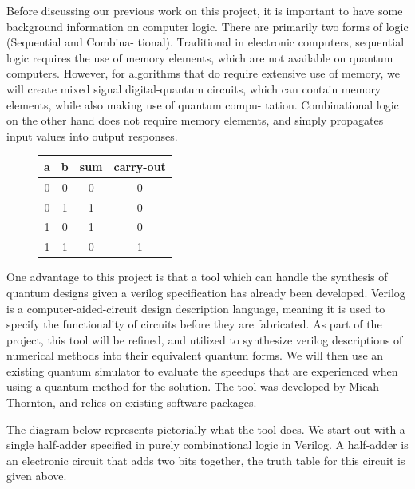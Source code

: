    Before discussing our previous work on this project, it is important to have
some background information on computer logic. There are primarily two forms of logic (Sequential and Combina-
tional). Traditional in electronic computers, sequential logic requires the use of memory elements, which are not available on quantum computers. However, for algorithms that do require extensive use of memory, we will create mixed signal
digital-quantum circuits, which can contain memory elements, while also making use of quantum compu-
tation. Combinational logic on the other hand does not require memory elements, and simply propagates
input values into output responses.


    \begin{figure}
   \begin{center}
\begin{tabular}{|c|c||c|c|}
\hline
a&b&sum&carry-out \\
\hline 
0&0&0&0 \\
0&1&1&0 \\
1&0&1&0 \\
1&1&0&1 \\
\hline
\end{tabular}
  \end{center}
\end{figure}
One advantage to this project is that a tool which can handle the synthesis of quantum designs given a verilog specification has already been developed. Verilog is a computer-aided-circuit design description language, meaning it is used to specify the functionality of circuits before they are fabricated.  
As part of the project, this tool will be refined, and utilized to synthesize verilog descriptions of numerical methods into their equivalent quantum forms. 
We will then use an existing quantum simulator to evaluate the speedups that are experienced when using a quantum method for the solution. 
The tool was developed by Micah Thornton, and relies on existing software packages. 





The diagram below represents pictorially what the tool does. We start out with a single half-adder specified in purely combinational logic in Verilog. A half-adder is an electronic circuit that adds two bits together, the truth table for this circuit is given above.


